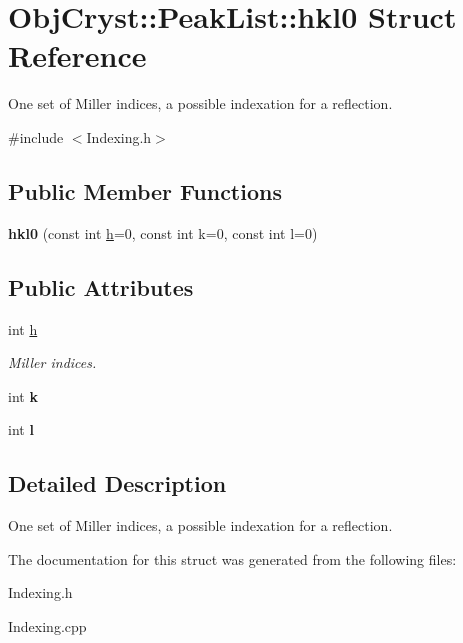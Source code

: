 \hypertarget{struct_obj_cryst_1_1_peak_list_1_1hkl0}{}\section{Obj\+Cryst\+::Peak\+List\+::hkl0 Struct Reference}
\label{struct_obj_cryst_1_1_peak_list_1_1hkl0}


One set of Miller indices, a possible indexation for a reflection.  




{\ttfamily \#include $<$Indexing.\+h$>$}

\subsection*{Public Member Functions}
\begin{DoxyCompactItemize}
\item 
\mbox{\label{struct_obj_cryst_1_1_peak_list_1_1hkl0_aba6db797121bd215eaa442ca9c17e0bc}} 
{\bfseries hkl0} (const int \mbox{\hyperlink{struct_obj_cryst_1_1_peak_list_1_1hkl0_a6cd45adccc4cce119c0a1f724a8b23f2}{h}}=0, const int k=0, const int l=0)
\end{DoxyCompactItemize}
\subsection*{Public Attributes}
\begin{DoxyCompactItemize}
\item 
\mbox{\label{struct_obj_cryst_1_1_peak_list_1_1hkl0_a6cd45adccc4cce119c0a1f724a8b23f2}} 
int \mbox{\hyperlink{struct_obj_cryst_1_1_peak_list_1_1hkl0_a6cd45adccc4cce119c0a1f724a8b23f2}{h}}
\begin{DoxyCompactList}\small\item\em Miller indices. \end{DoxyCompactList}\item 
\mbox{\label{struct_obj_cryst_1_1_peak_list_1_1hkl0_a5b4b0cfe066f3028edbf510f989b717b}} 
int {\bfseries k}
\item 
\mbox{\label{struct_obj_cryst_1_1_peak_list_1_1hkl0_a4465980d0e2e202ab5f7415facf71892}} 
int {\bfseries l}
\end{DoxyCompactItemize}


\subsection{Detailed Description}
One set of Miller indices, a possible indexation for a reflection. 

The documentation for this struct was generated from the following files\+:\begin{DoxyCompactItemize}
\item 
Indexing.\+h\item 
Indexing.\+cpp\end{DoxyCompactItemize}
